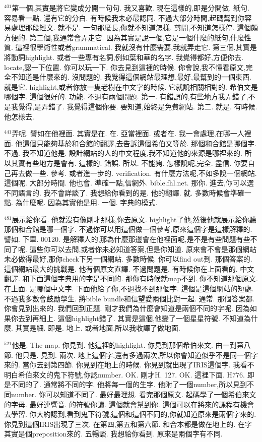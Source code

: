\documentclass{book}
\begin{document}
$^{401}$第一個,其實是將它變成分開一句句.
我又喜歡.
現在這樣的,即是分開做.
紙句.
容易看一點.
還有它的分白.
有時候我未必最認同.
不過大部分時間,起碼幫到你容易處理那段經文.
就不是.
一句那麼長,你就不知道怎樣.
剪開,不知道怎樣停.
這個頗方便的.
第二個,我通常會弄走它.
因為其實是說一個,它是一個什麼的紙句,什麼性質.
這裡很學術性或者grammatical.
我就沒有什麼需要,我就弄走它.
第三個,其實是將動詞highlight.
或者一些專有名詞,例如葉和華的名字.
我覺得都好,方便你去.
locate,認一下位置.
你可以玩一下.
你去見到這裡的時候.
你會說,我不懂看原文,完全不知道是什麼來的.
沒問題的.
我覺得這個網站最理想,最好,最幫到的一個東西.
就是它.
highlight,或者你放一隻老樹在中文字的時候.
它就說相關相對的.
希伯文是哪個字.
這個很好的.
功能.
不過有兩個問題.
第一.
有錯誤的,有些地方我弄錯了,不是我覺得,是弄錯了.
我覺得這個你要.
要知道,始終是免費網站.
第二.
就是.
有時候.
他怎樣去.

$^{441}$弄呢.
譬如在他裡面.
其實是在.
在.
亞當裡面.
或者在.
我一會處理,在哪一人裡面.
他這個只能夠基於和合館的翻譯,去告訴這個希伯文等於.
那個和合館是哪個字.
不過.
我不知道他是.
設計網站的人的中文程度,我不知道他的來源是哪裡來的.
所以其實有些地方是會有.
這樣的.
錯誤.
所以.
不能夠.
怎樣說呢,完全.
盡信.
你要自己再去做一些.
參考.
或者進一步的.
verification.
有什麼方法呢,不如多說一個網站.
這個呢.
大部分時間.
他也會.
準確一點,信網外.
bible.fhl.net.
那你.
進去,你可以選不同語言的.
我不會詳談了.
我想給你看到的是.
他的翻譯.
就.
多數時候會準確一點.
為什麼呢.
因為其實他是用.
一個.
字典的模式.

$^{481}$展示給你看.
他就沒有像剛才那樣,你去原文.
highlight了他,然後他就展示給你聽那個和合館是哪一個字.
不過你可以用這個做一個參考,原來這個字是這樣解釋的.
譬如.
下單.
00120.
是解釋人的,那為什麼那邊會在他裡面呢,是不是有些問題有些不同了呢.
這些你可以去問,或者你未必知道答案,但是你知道.
原來會不會是那個網站未必做得最好,那你check下另一個網站.
多數時候.
你可以find out到.
那個答案的.
這個網站最大的挑戰是.
他有個原文直譯.
不過問題是.
有時候你在上面看的.
中文翻譯.
和下面這個字典用的字是不同的.
那你有時候就map不到.
你不知道那個原文.
在上面.
是哪個中文字.
下面他給了你,不過找不到那個字.
這個是這個網站的短處.
不過我多數會鼓勵學生.
將bible bundle和信望愛兩個比對一起.
通常.
那個答案都.
你會見到出來的.
我們回到正題.
剛才我們為什麼會知道是兩個不同的字呢.
因為如果你去到再細上.
這個highlight錯了.
其實是這個,他變了一個星星符號.
不知道為什麼.
其實是細.
即是.
地上.
或者地面,所以我收譯了做地面.

$^{521}$他是.
The map.
你見到.
他這裡的highlight.
你見到那個希伯來文.
由一到第八節.
他只是.
見到.
兩次.
地上這個字,還有多過兩次,所以你會知道似乎不是同一個字來的.
當你去到第四節.
你見到在地上的時候.
你見到就出現了IRIS這個字.
我看不明白希伯來文的鬼下符號,你認number.
OK.
剛才H.
127.
OK.
這裡下面.
H776.
即是不同的了.
通常將不同的字.
他將每一個的生字.
他附了一個number,所以見到不同number.
你可以知道不同了.
最好最理想.
看完那個原文.
起碼學了一個希伯來文的字母.
最好連響音.
的符號你讀.
這個就會幫到你.
這個可以在將來的課程有機會去學習.
你大約認到,看到鬼下符號,這個和這個不同的,你就知道原來是兩個字來的.
你見到這個IRIS出現了三次.
在第四,第五和第六節.
和合本都是做在地上的.
在字其實是個preposition來的.
五暢談.
我想給你看到.
原來是兩個字有不同.
\end{document}
